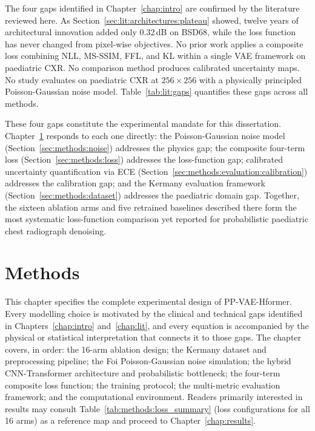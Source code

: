 \documentclass[12pt, a4paper, twoside, openright]{book}
\begin{document}
The four gaps identified in Chapter~\ref{chap:intro} are confirmed by the literature reviewed here. As Section~\ref{sec:lit:architectures:plateau} showed, twelve years of architectural innovation added only 0.32\,dB on BSD68, while the loss function has never changed from pixel-wise objectives. No prior work applies a composite loss combining NLL, MS-SSIM, FFL, and KL within a single VAE framework on paediatric CXR. No comparison method produces calibrated uncertainty maps. No study evaluates on paediatric CXR at $256\times256$ with a physically principled Poisson-Gaussian noise model. Table~\ref{tab:lit:gaps} quantifies these gaps across all methods.

These four gaps constitute the experimental mandate for this dissertation. Chapter~\ref{chap:methods} responds to each one directly: the Poisson-Gaussian noise model (Section~\ref{sec:methods:noise}) addresses the physics gap; the composite four-term loss (Section~\ref{sec:methods:loss}) addresses the loss-function gap; calibrated uncertainty quantification via ECE (Section~\ref{sec:methods:evaluation:calibration}) addresses the calibration gap; and the Kermany evaluation framework (Section~\ref{sec:methods:dataset}) addresses the paediatric domain gap. Together, the sixteen ablation arms and five retrained baselines described there form the most systematic loss-function comparison yet reported for probabilistic paediatric chest radiograph denoising.

\chapter{Methods}
\label{chap:methods}

This chapter specifies the complete experimental design of PP-VAE-Hformer. Every modelling choice is motivated by the clinical and technical gaps identified in Chapters~\ref{chap:intro} and~\ref{chap:lit}, and every equation is accompanied by the physical or statistical interpretation that connects it to those gaps. The chapter covers, in order: the 16-arm ablation design; the Kermany dataset and preprocessing pipeline; the Foi Poisson-Gaussian noise simulation; the hybrid CNN-Transformer architecture and probabilistic bottleneck; the four-term composite loss function; the training protocol; the multi-metric evaluation framework; and the computational environment. Readers primarily interested in results may consult Table~\ref{tab:methods:loss_summary} (loss configurations for all 16 arms) as a reference map and proceed to Chapter~\ref{chap:results}.
\end{document}
